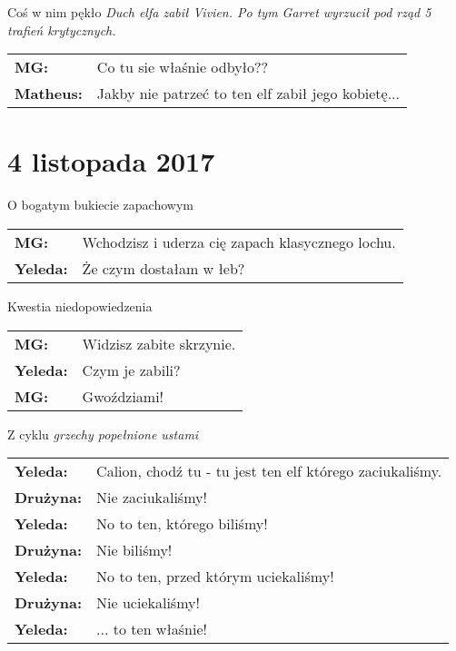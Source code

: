 \documentclass[10pt,twoside,twocolumn]{book}
\begin{document}
\begin{rpg-quotebox}{Coś w nim pękło}
   \textit{Duch elfa zabił Vivien. Po tym Garret wyrzucił pod rząd 5 trafień krytycznych.}\\

   \begin{tabularx}{\columnwidth}{lX}
      \textbf{MG:} & Co tu sie właśnie odbyło??\\
      \textbf{Matheus:} & Jakby nie patrzeć to ten elf zabił jego kobietę...\\
   \end{tabularx}
\end{rpg-quotebox}

\section*{4 listopada 2017}

\begin{rpg-quotebox}{O bogatym bukiecie zapachowym}
   \begin{tabularx}{\columnwidth}{lX}
      \textbf{MG:} & Wchodzisz i uderza cię zapach klasycznego lochu.\\
      \textbf{Yeleda:} & Że czym dostałam w łeb?\\
   \end{tabularx}
\end{rpg-quotebox}

\begin{rpg-quotebox}{Kwestia niedopowiedzenia}
   \begin{tabularx}{\columnwidth}{lX}
      \textbf{MG:} & Widzisz zabite skrzynie.\\
      \textbf{Yeleda:} & Czym je zabili?\\
      \textbf{MG:} & Gwoździami!\\
   \end{tabularx}
\end{rpg-quotebox}

\begin{rpg-quotebox}{Z cyklu \emph{grzechy popełnione ustami}}
   \begin{tabularx}{\columnwidth}{lX}
      \textbf{Yeleda:} & Calion, chodź tu - tu jest ten elf którego zaciukaliśmy.\\
      \textbf{Drużyna:} & Nie zaciukaliśmy!\\
      \textbf{Yeleda:} & No to ten, którego biliśmy!\\
      \textbf{Drużyna:} & Nie biliśmy!\\
      \textbf{Yeleda:} & No to ten, przed którym uciekaliśmy!\\
      \textbf{Drużyna:} & Nie uciekaliśmy!\\
      \textbf{Yeleda:} & ... to ten właśnie!\\
   \end{tabularx}
\end{rpg-quotebox}
\end{document}
